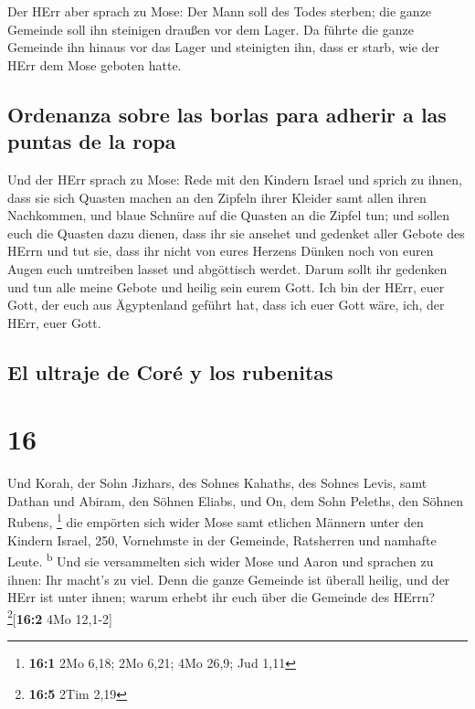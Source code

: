  Der HErr aber sprach zu Mose: Der Mann soll des Todes
sterben; die ganze Gemeinde soll ihn steinigen draußen vor dem Lager.
 Da führte die ganze Gemeinde ihn hinaus vor das Lager
und steinigten ihn, dass er starb, wie der HErr dem Mose geboten hatte.

\hypertarget{ordenanza-sobre-las-borlas-para-adherir-a-las-puntas-de-la-ropa}{%
\subsection{Ordenanza sobre las borlas para adherir a las puntas de la
ropa}\label{ordenanza-sobre-las-borlas-para-adherir-a-las-puntas-de-la-ropa}}

 Und der HErr sprach zu Mose:  Rede mit
den Kindern Israel und sprich zu ihnen, dass sie sich Quasten machen an
den Zipfeln ihrer Kleider samt allen ihren Nachkommen, und blaue Schnüre
auf die Quasten an die Zipfel tun;  und sollen euch die
Quasten dazu dienen, dass ihr sie ansehet und gedenket aller Gebote des
HErrn und tut sie, dass ihr nicht von eures Herzens Dünken noch von
euren Augen euch umtreiben lasset und abgöttisch werdet. 
Darum sollt ihr gedenken und tun alle meine Gebote und heilig sein eurem
Gott.  Ich bin der HErr, euer Gott, der euch aus
Ägyptenland geführt hat, dass ich euer Gott wäre, ich, der HErr, euer
Gott.

\hypertarget{el-ultraje-de-coruxe9-y-los-rubenitas}{%
\subsection{El ultraje de Coré y los
rubenitas}\label{el-ultraje-de-coruxe9-y-los-rubenitas}}

\hypertarget{section-15}{%
\section{16}\label{section-15}}

 Und Korah, der Sohn Jizhars, des Sohnes Kahaths, des
Sohnes Levis, samt Dathan und Abiram, den Söhnen Eliabs, und On, dem
Sohn Peleths, den Söhnen Rubens, \footnote{\textbf{16:1} 2Mo 6,18; 2Mo
  6,21; 4Mo 26,9; Jud 1,11}  die empörten sich wider Mose
samt etlichen Männern unter den Kindern Israel, 250, Vornehmste in der
Gemeinde, Ratsherren und namhafte Leute. \textsuperscript{b}
 Und sie versammelten sich wider Mose und Aaron und
sprachen zu ihnen: Ihr macht's zu viel. Denn die ganze Gemeinde ist
überall heilig, und der HErr ist unter ihnen; warum erhebt ihr euch über
die Gemeinde des HErrn? \footnote{\textbf{16:5} 2Tim 2,19}{[}\textbf{16:2}
4Mo 12,1-2{]}

